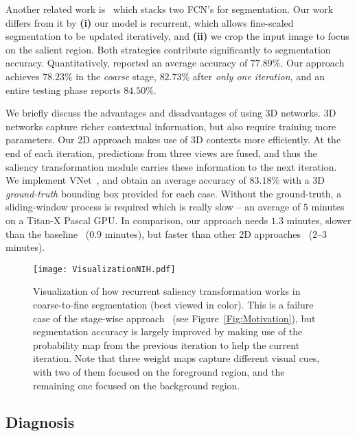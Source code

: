 \documentclass[10pt,twocolumn,letterpaper]{article}
\begin{document}
Another related work is~\cite{Zhang_2016_Coarse} which stacks two FCN's for segmentation.
Our work differs from it by {\bf (i)} our model is recurrent, which allows fine-scaled segmentation to be updated iteratively,
and {\bf (ii)} we crop the input image to focus on the salient region.
Both strategies contribute significantly to segmentation accuracy.
Quantitatively, \cite{Zhang_2016_Coarse} reported an average accuracy of $77.89\%$.
Our approach achieves $78.23\%$ in the {\em coarse} stage, $82.73\%$ after {\em only one iteration},
and an entire testing phase reports $84.50\%$.

We briefly discuss the advantages and disadvantages of using 3D networks.
3D networks capture richer contextual information, but also require training more parameters.
Our 2D approach makes use of 3D contexts more efficiently.
At the end of each iteration, predictions from three views are fused,
and thus the saliency transformation module carries these information to the next iteration.
We implement VNet~\cite{Milletari_2016_VNet},
and obtain an average accuracy of $83.18\%$ with a 3D {\em ground-truth} bounding box provided for each case.
Without the ground-truth, a sliding-window process is required which is really slow --
an average of $5$ minutes on a Titan-X Pascal GPU.
In comparison, our approach needs $1.3$ minutes, slower than the baseline~\cite{Zhou_2017_Fixed} ($0.9$ minutes),
but faster than other 2D approaches~\cite{Roth_2015_DeepOrgan}\cite{Roth_2016_Spatial} ($2$--$3$ minutes).

\renewcommand{\figurewidth}{16.0cm}
\begin{figure*}[t]
\begin{center}
    \texttt{[image: VisualizationNIH.pdf]}
\end{center}
\caption{
    Visualization of how recurrent saliency transformation works in coarse-to-fine segmentation (best viewed in color).
    This is a failure case of the stage-wise approach~\cite{Zhou_2017_Fixed} (see Figure~\ref{Fig:Motivation}),
    but segmentation accuracy is largely improved
    by making use of the probability map from the previous iteration to help the current iteration.
    Note that three weight maps capture different visual cues,
    with two of them focused on the foreground region, and the remaining one focused on the background region.
}
\label{Fig:VisualizationNIH}
\end{figure*}


\subsection{Diagnosis}
\label{ExperimentsNIH:Diagnosis}
\end{document}
